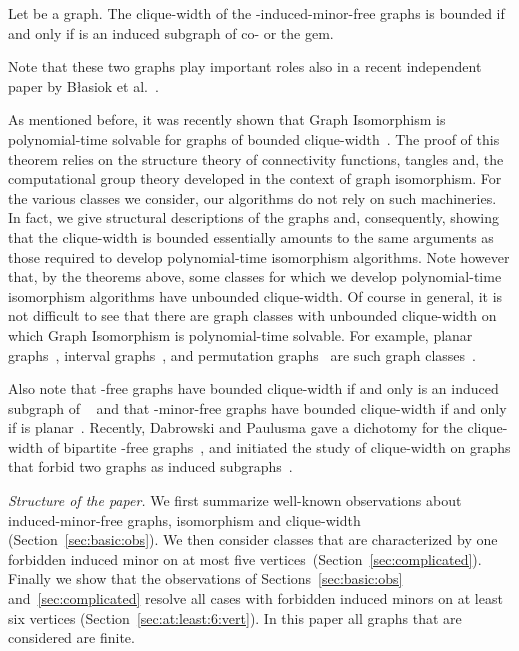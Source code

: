 \documentclass[envcountsame,envcountsect,11pt,a4paper]{llncs}
\begin{document}
\begin{theorem}
\label{thm:clique-width}
Let  be a graph. The clique-width of the -induced-minor-free graphs is bounded if and only if  is an induced subgraph of
co- or the gem.
\end{theorem}
Note that these two graphs play important roles also in a recent independent paper by B{\l}asiok et al.~\cite{BlasiokKRT15}.


As mentioned before, it was recently shown that {\sc Graph Isomorphism} is polynomial-time solvable for graphs of bounded clique-width~\cite{rankwidth}.
The proof of this theorem relies on the structure theory of connectivity functions, tangles
and, the computational group theory developed in the context of graph isomorphism.
For the various classes we consider, our algorithms do not rely on such machineries.  In fact, we give structural descriptions of the graphs
and, consequently, showing that the clique-width is bounded essentially amounts to the same arguments as those required to develop
polynomial-time isomorphism algorithms.
Note however that, by the theorems above, some classes for which we develop polynomial-time isomorphism algorithms have unbounded clique-width. 
Of course in general, it is not difficult to see that there are graph classes with unbounded clique-width on which {\sc Graph Isomorphism}
is polynomial-time solvable.  For example, planar graphs~\cite{DBLP:conf/coco/HopcroftT72}, interval graphs~\cite{LuekerB79},
and permutation graphs~\cite{Colbourn81} are such graph classes~\cite{GolumbicR00}.

Also note that -free graphs have bounded clique-width if and only  is an induced subgraph of ~\cite{DP16+} and that -minor-free
graphs have bounded clique-width if and only if  is planar~\cite{KaminskiLozinMilanic2009}.  Recently, Dabrowski and Paulusma gave a
dichotomy for the clique-width of bipartite -free graphs~\cite{DP16}, and initiated the study of clique-width on graphs that forbid two
graphs as induced subgraphs~\cite{DP16+}.

{\it Structure of the paper.}
We first summarize well-known observations about induced-minor-free graphs, isomorphism and clique-width (Section~\ref{sec:basic:obs}).
We then consider classes that are characterized by one forbidden induced minor on at most five vertices~(Section~\ref{sec:complicated}). 
Finally we show that the observations of Sections~\ref{sec:basic:obs} and~\ref{sec:complicated} resolve all cases with forbidden induced minors on at least six vertices (Section~\ref{sec:at:least:6:vert}). 
In this paper all graphs that are considered are finite. 
\end{document}
